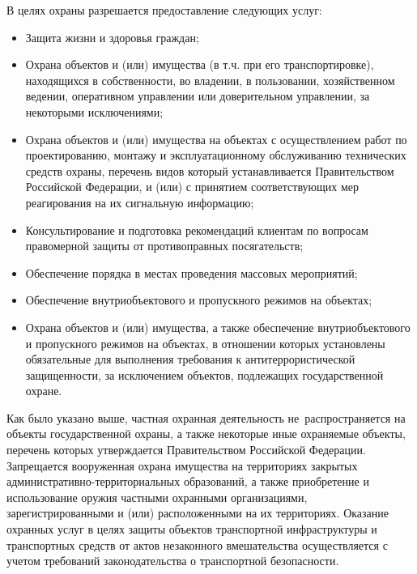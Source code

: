 \documentclass[a4paper,12pt,fleqn]{article} %
\begin{document}
В целях охраны разрешается предоставление следующих услуг:
\begin{itemize}
	\item Защита жизни и здоровья граждан;
	\item Охрана объектов и (или) имущества (в т.ч. при его транспортировке), находящихся в собственности, во владении, в пользовании, хозяйственном ведении, оперативном управлении или доверительном управлении, за некоторыми исключениями;
	\item Охрана объектов и (или) имущества на объектах с осуществлением работ по проектированию, монтажу и эксплуатационному обслуживанию технических средств охраны, перечень видов который устанавливается Правительством Российской Федерации, и (или) с принятием соответствующих мер реагирования на их сигнальную информацию;
	\item Консультирование и подготовка рекомендаций клиентам по вопросам правомерной защиты от противоправных посягательств;
	\item Обеспечение порядка в местах проведения массовых мероприятий;
	\item Обеспечение внутриобъектового и пропускного режимов на объектах;
	\item Охрана объектов и (или) имущества, а также обеспечение внутриобъектового и пропускного режимов на объектах, в отношении которых установлены обязательные для выполнения требования к антитеррористической защищенности, за исключением объектов, подлежащих государственной охране.
\end{itemize}

Как было указано выше, частная охранная деятельность не~распространяется на объекты государственной охраны, а также некоторые иные охраняемые объекты, перечень которых утверждается Правительством Российской Федерации. Запрещается вооруженная охрана имущества на территориях закрытых административно-территориальных образований, а также приобретение и использование оружия частными охранными организациями, зарегистрированными и (или) расположенными на их территориях. Оказание охранных услуг в целях защиты объектов транспортной инфраструктуры и транспортных средств от актов незаконного вмешательства осуществляется с учетом требований законодательства о транспортной безопасности.
\end{document}

